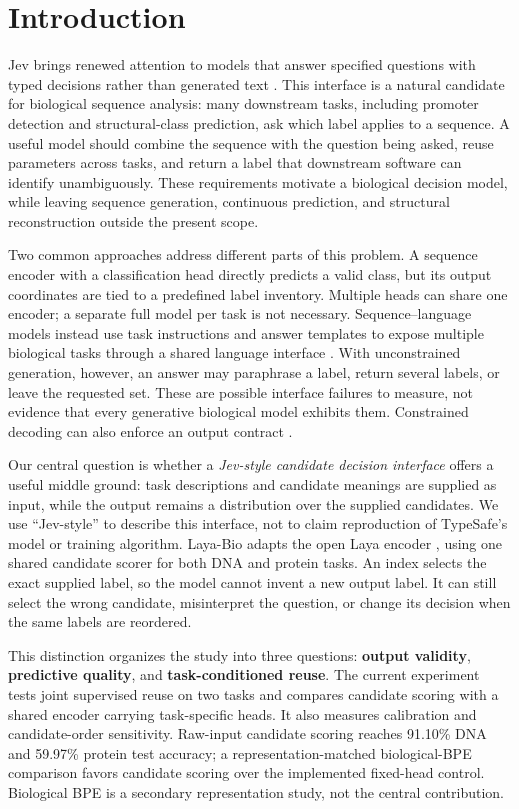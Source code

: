 \section{Introduction}
Jev brings renewed attention to models that answer specified questions with typed decisions rather than generated text \citep{almeida2026jev}. This interface is a natural candidate for biological sequence analysis: many downstream tasks, including promoter detection and structural-class prediction, ask which label applies to a sequence. A useful model should combine the sequence with the question being asked, reuse parameters across tasks, and return a label that downstream software can identify unambiguously. These requirements motivate a biological decision model, while leaving sequence generation, continuous prediction, and structural reconstruction outside the present scope.

Two common approaches address different parts of this problem. A sequence encoder with a classification head directly predicts a valid class, but its output coordinates are tied to a predefined label inventory. Multiple heads can share one encoder; a separate full model per task is not necessary. Sequence--language models instead use task instructions and answer templates to expose multiple biological tasks through a shared language interface \citep{wang2024llamagene,almeida2025chatnt}. With unconstrained generation, however, an answer may paraphrase a label, return several labels, or leave the requested set. These are possible interface failures to measure, not evidence that every generative biological model exhibits them. Constrained decoding can also enforce an output contract \citep{scholak2021picard}.

Our central question is whether a \emph{Jev-style candidate decision interface} offers a useful middle ground: task descriptions and candidate meanings are supplied as input, while the output remains a distribution over the supplied candidates. We use ``Jev-style'' to describe this interface, not to claim reproduction of TypeSafe's model or training algorithm. Laya-Bio adapts the open Laya encoder \citep{laya2026}, using one shared candidate scorer for both DNA and protein tasks. An index selects the exact supplied label, so the model cannot invent a new output label. It can still select the wrong candidate, misinterpret the question, or change its decision when the same labels are reordered.

This distinction organizes the study into three questions: \textbf{output validity}, \textbf{predictive quality}, and \textbf{task-conditioned reuse}. The current experiment tests joint supervised reuse on two tasks and compares candidate scoring with a shared encoder carrying task-specific heads. It also measures calibration and candidate-order sensitivity. Raw-input candidate scoring reaches 91.10\% DNA and 59.97\% protein test accuracy; a representation-matched biological-BPE comparison favors candidate scoring over the implemented fixed-head control. Biological BPE is a secondary representation study, not the central contribution.


